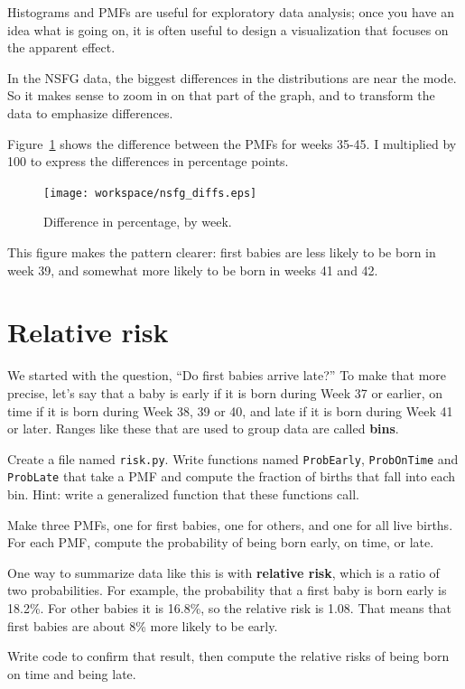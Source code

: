 \documentclass[12pt]{book}
\begin{document}
Histograms and PMFs are useful for exploratory data analysis;
once you have an idea what is going on, it is often useful to
design a visualization that focuses on the apparent effect.

In the NSFG data, the biggest differences in the distributions are
near the mode.  So it makes sense to zoom in on that part of the
graph, and to transform the data to emphasize differences.

Figure~\ref{nsfg_diffs} shows the difference between the PMFs for weeks
35-45.  I multiplied by 100 to express the differences in percentage
points.

\begin{figure}
\centerline{\texttt{[image: workspace/nsfg\_diffs.eps]}}
\caption{Difference in percentage, by week.}
\label{nsfg_diffs}
\end{figure}

This figure makes the pattern clearer: first babies are
less likely to be born in week 39, and somewhat more likely
to be born in weeks 41 and 42.


\section{Relative risk}
\label{relative.risk}

We started with the question, ``Do first babies arrive late?''  To
make that more precise, let's say that a baby is early if it is born
during Week 37 or earlier, on time if it is born during Week 38, 39 or
40, and late if it is born during Week 41 or later.  Ranges like these
that are used to group data are called {\bf bins}.

\begin{ex}

Create a file named {\tt risk.py}.
Write functions named {\tt ProbEarly}, {\tt ProbOnTime} and
{\tt ProbLate} that take a PMF and compute the fraction of births
that fall into each bin.  Hint: write a generalized function
that these functions call.

Make three PMFs, one for first babies, one for others, and one for
all live births.  For each PMF, compute the probability of being
born early, on time, or late.

One way to summarize data like this is with {\bf relative risk},
which is a ratio of two probabilities.  For example, the probability
that a first baby is born early is 18.2\%.  For other babies it is
16.8\%, so the relative risk is 1.08.  That means that first babies
are about 8\% more likely to be early.

Write code to confirm that result, then compute the relative risks of
being born on time and being late.

\end{ex}
\end{document}

